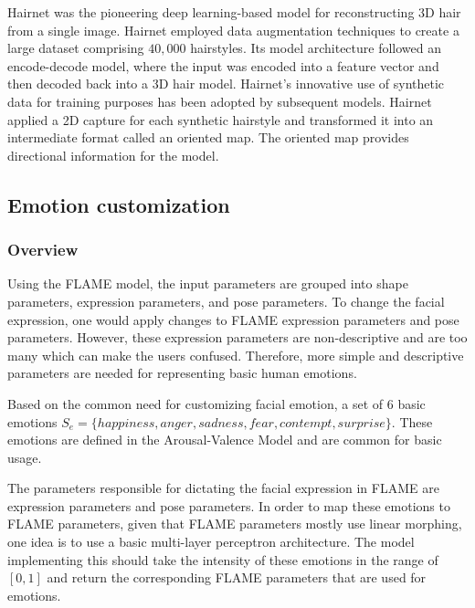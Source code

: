 
Hairnet \cite{zhouHairNetSingleViewHair2018} was the pioneering deep learning-based model for reconstructing 3D hair from a single image. Hairnet employed data augmentation techniques to create a large dataset comprising $40,000$ hairstyles. Its model architecture followed an encode-decode model, where the input was encoded into a feature vector and then decoded back into a 3D hair model. Hairnet's innovative use of synthetic data for training purposes has been adopted by subsequent models. Hairnet applied a 2D capture for each synthetic hairstyle and transformed it into an intermediate format called an oriented map. The oriented map provides directional information for the model.

\subsection{Emotion customization}

\subsubsection{Overview}

Using the FLAME model, the input parameters are grouped into shape parameters, expression parameters, and pose parameters. To change the facial expression, one would apply changes to FLAME expression parameters and pose parameters. However, these expression parameters are non-descriptive and are too many which can make the users confused. Therefore, more simple and descriptive parameters are needed for representing basic human emotions.

Based on the common need for customizing facial emotion, a set of 6 basic emotions $S_e=\{ happiness, anger, sadness, fear, contempt, surprise\}$. These emotions are defined in the Arousal-Valence Model and are common for basic usage. 

The parameters responsible for dictating the facial expression in FLAME are expression parameters and pose parameters. In order to map these emotions to FLAME parameters, given that FLAME parameters mostly use linear morphing, one idea is to use a basic multi-layer perceptron architecture. The model implementing this should take the intensity of these emotions in the range of $[0,1]$ and return the corresponding FLAME parameters that are used for emotions.